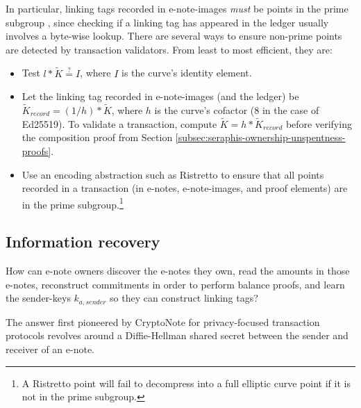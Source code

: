 In particular, linking tags recorded in e-note-images {\em must} be points in the prime subgroup \cite{key-image-bug}, since checking if a linking tag has appeared in the ledger usually involves a byte-wise lookup. There are several ways to ensure non-prime points are detected by transaction validators. From least to most efficient, they are:

\begin{itemize}
    \item Test $l*\tilde{K} \stackrel{?}{=} I$, where $I$ is the curve's identity element.

    \item Let the linking tag recorded in e-note-images (and the ledger) be $\tilde{K}_{record} = (1/h)*\tilde{K}$, where $h$ is the curve's cofactor (8 in the case of Ed25519). To validate a transaction, compute $\tilde{K} = h*\tilde{K}_{record}$ before verifying the composition proof from Section \ref{subsec:seraphis-ownership-unspentness-proofs}.

    \item Use an encoding abstraction such as Ristretto \cite{ristretto} to ensure that all points recorded in a transaction (in e-notes, e-note-images, and proof elements) are in the prime subgroup.\footnote{A Ristretto point will fail to decompress into a full elliptic curve point if it is not in the prime subgroup.}
\end{itemize}


\subsection{Information recovery}
\label{subsec:implementers-information-recovery}

How can e-note owners discover the e-notes they own, read the amounts in those e-notes, reconstruct commitments in order to perform balance proofs, and learn the sender-keys $k_{a,sender}$ so they can construct linking tags?

The answer first pioneered by CryptoNote \cite{cryptoNoteWhitePaper} for privacy-focused transaction protocols revolves around a Diffie-Hellman shared secret between the sender and receiver of an e-note.

